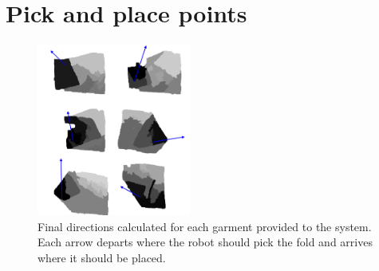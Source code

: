 \section{Pick and place points}
\begin{figure}[thpb]
    \centering
    \includegraphics[width=0.45\textwidth]{figures/directions.pdf}
    \caption{Final directions calculated for each garment provided to the system. Each arrow departs where the robot should pick the fold and arrives where it should be placed.}
    \label{directions}
\end{figure}